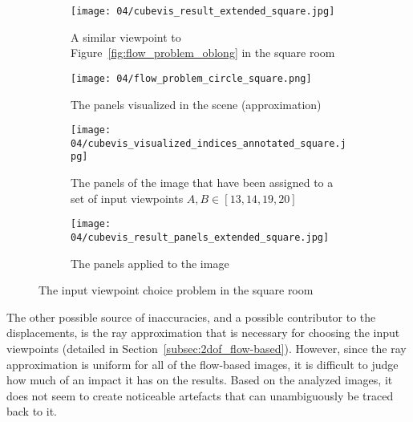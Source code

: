 \begin{figure}
\centering
    \hfill
    \begin{subfigure}[c]{0.45\textwidth}
            \centering
            \texttt{[image: 04/cubevis\_result\_extended\_square.jpg]}
            \caption{A similar viewpoint to Figure~\ref{fig:flow_problem_oblong} in the square room}
    \end{subfigure}
    \hfill
    \begin{subfigure}[c]{0.45\textwidth}
            \centering
            \texttt{[image: 04/flow\_problem\_circle\_square.png]}
            \caption{The panels visualized in the scene (approximation)}
    \end{subfigure}
    \hfill

    \hfill
    \begin{subfigure}[c]{0.45\textwidth}
            \centering
            \texttt{[image: 04/cubevis\_visualized\_indices\_annotated\_square.jpg]}
            \caption{The panels of the image that have been assigned to a set of input viewpoints $A, B \in [13, 14, 19, 20]$}
    \end{subfigure}
    \hfill
    \begin{subfigure}[c]{0.45\textwidth}
            \centering
            \texttt{[image: 04/cubevis\_result\_panels\_extended\_square.jpg]}
            \caption{The panels applied to the image}
    \end{subfigure}
    \hfill
  \caption{The input viewpoint choice problem in the square room}
  \label{fig:flow_problem_square}
\end{figure}

The other possible source of inaccuracies, and a possible contributor to the displacements, is the ray approximation that is necessary for choosing the input viewpoints (detailed in Section~\ref{subsec:2dof_flow-based}). However, since the ray approximation is uniform for all of the flow-based images, it is difficult to judge how much of an impact it has on the results. Based on the analyzed images, it does not seem to create noticeable artefacts that can unambiguously be traced back to it.




















